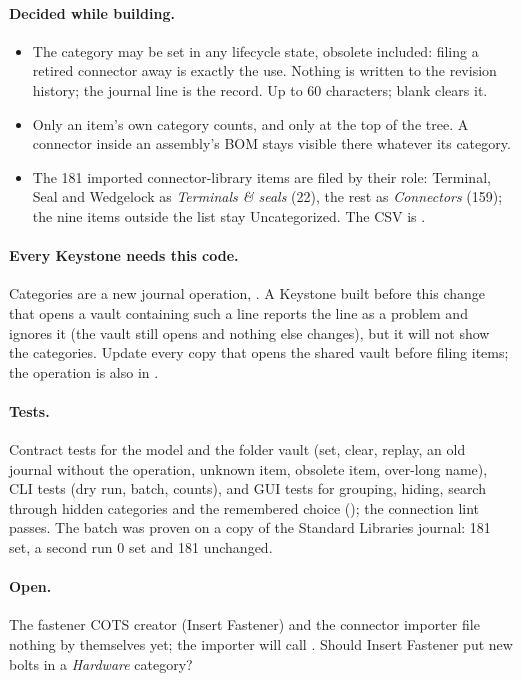 \paragraph{Decided while building.}
\begin{itemize}[nosep]
  \item The category may be set in any lifecycle state, obsolete included: filing a retired connector away is
        exactly the use. Nothing is written to the revision history; the journal line is the record. Up to 60
        characters; blank clears it.
  \item Only an item's own category counts, and only at the top of the tree. A connector inside an assembly's BOM
        stays visible there whatever its category.
  \item The 181 imported connector-library items are filed by their role: Terminal, Seal and Wedgelock as
        \emph{Terminals \& seals} (22), the rest as \emph{Connectors} (159); the nine items outside the list stay
        Uncategorized. The CSV is .
\end{itemize}

\paragraph{Every Keystone needs this code.} Categories are a new journal operation, . A Keystone
built before this change that opens a vault containing such a line reports the line as a problem and ignores it
(the vault still opens and nothing else changes), but it will not show the categories. Update every copy that
opens the shared vault before filing items; the operation is also in .

\paragraph{Tests.} Contract tests for the model and the folder vault (set, clear, replay, an old journal without the
operation, unknown item, obsolete item, over-long name), CLI tests (dry run, batch, counts), and GUI tests for
grouping, hiding, search through hidden categories and the remembered choice (); the
connection lint passes. The batch was proven on a copy of the Standard Libraries journal: 181 set, a second run
0 set and 181 unchanged.

\paragraph{Open.} The fastener COTS creator (Insert Fastener) and the connector importer file nothing by themselves
yet; the importer will call . Should Insert Fastener put new bolts in a
\emph{Hardware} category?
